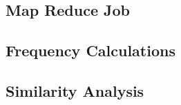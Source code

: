 \documentclass[a4paper]{article}
\begin{document}
	\subsection{Map Reduce Job}

	\subsection{Frequency Calculations}

	\subsection{Similarity Analysis}

	\newpage

	\printbibheading
	\printbibliography[nottype=book,heading=subbibliography,title={Online Sources}]
\end{document}
